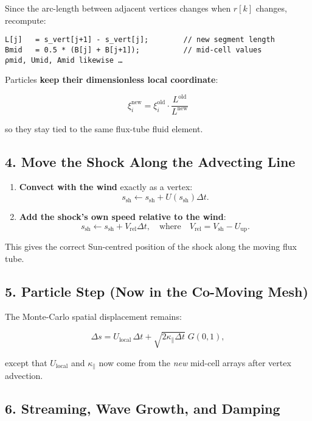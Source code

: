 Since the arc-length between adjacent vertices changes when $r[k]$ changes, recompute:

\begin{verbatim}
L[j]   = s_vert[j+1] - s_vert[j];        // new segment length
Bmid   = 0.5 * (B[j] + B[j+1]);          // mid-cell values
ρmid, Umid, Amid likewise …
\end{verbatim}

Particles \textbf{keep their dimensionless local coordinate}:

\[
\xi_i^{\text{new}} = \xi_i^{\text{old}} \cdot \frac{L^{\text{old}}}{L^{\text{new}}}
\]

so they stay tied to the same flux-tube fluid element.

\subsection*{4. Move the Shock Along the Advecting Line}

\begin{enumerate}
    \item \textbf{Convect with the wind} exactly as a vertex:
    \[
    s_{\text{sh}} \leftarrow s_{\text{sh}} + U(s_{\text{sh}}) \Delta t.
    \]
    \item \textbf{Add the shock’s own speed relative to the wind}:
    \[
    s_{\text{sh}} \leftarrow s_{\text{sh}} + V_{\text{rel}} \Delta t,
    \quad \text{where} \quad V_{\text{rel}} = V_{\text{sh}} - U_{\text{up}}.
    \]
\end{enumerate}

This gives the correct Sun-centred position of the shock along the moving flux tube.

\subsection*{5. Particle Step (Now in the Co-Moving Mesh)}

The Monte-Carlo spatial displacement remains:

\[
\Delta s = U_{\text{local}}\,\Delta t + \sqrt{2 \kappa_\parallel \Delta t}\;G(0,1),
\]

except that $U_{\text{local}}$ and $\kappa_\parallel$ now come from the \emph{new} mid-cell arrays after vertex advection.

\subsection*{6. Streaming, Wave Growth, and Damping}

